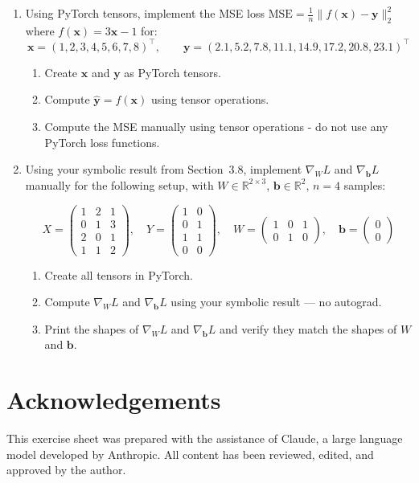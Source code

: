\documentclass[12pt, a4paper]{scrartcl}
\begin{document}
\begin{enumerate}

\item Using PyTorch tensors, implement the MSE loss $\mathrm{MSE} =
\frac{1}{n}\|f(\mathbf{x}) - \mathbf{y}\|_2^2$ where $f(\mathbf{x}) = 3\mathbf{x}
- 1$ for:
\[
\mathbf{x} = (1, 2, 3, 4, 5, 6, 7, 8)^\top, \qquad
\mathbf{y} = (2.1, 5.2, 7.8, 11.1, 14.9, 17.2, 20.8, 23.1)^\top
\]

\begin{enumerate}
    \item Create $\mathbf{x}$ and $\mathbf{y}$ as PyTorch tensors.
    \item Compute $\hat{\mathbf{y}} = f(\mathbf{x})$ using tensor operations.
    \item Compute the MSE manually using tensor operations - do not use any
    PyTorch loss functions.
\end{enumerate}

\item Using your symbolic result from Section~3.8, implement $\nabla_W L$ and
$\nabla_\mathbf{b} L$ manually for the following setup, with $W \in
\mathbb{R}^{2 \times 3}$, $\mathbf{b} \in \mathbb{R}^2$, $n = 4$ samples:

\[
X = \begin{pmatrix} 1 & 2 & 1 \\ 0 & 1 & 3 \\ 2 & 0 & 1 \\ 1 & 1 & 2
\end{pmatrix}, \quad
Y = \begin{pmatrix} 1 & 0 \\ 0 & 1 \\ 1 & 1 \\ 0 & 0 \end{pmatrix}, \quad
W = \begin{pmatrix} 1 & 0 & 1 \\ 0 & 1 & 0 \end{pmatrix}, \quad
\mathbf{b} = \begin{pmatrix} 0 \\ 0 \end{pmatrix}
\]

\begin{enumerate}
    \item Create all tensors in PyTorch.
    \item Compute $\nabla_W L$ and $\nabla_\mathbf{b} L$ using your symbolic
    result — no autograd.
    \item Print the shapes of $\nabla_W L$ and $\nabla_\mathbf{b} L$ and verify
    they match the shapes of $W$ and $\mathbf{b}$.
\end{enumerate}

\end{enumerate}

\section*{Acknowledgements}
This exercise sheet was prepared with the assistance of Claude, a large
language model developed by Anthropic. All content has been reviewed, edited,
and approved by the author.
\end{document}
